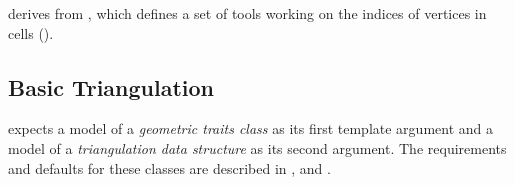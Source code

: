  derives from
, 
which defines a set of tools
working on the indices of vertices in cells 
(). 

\subsection{Basic Triangulation}

 expects a model of a 
\textit{geometric traits class} as its first template argument and a model 
of a \textit{triangulation data structure} as its second argument. The
requirements and defaults for these classes are described in
,
 and
.









